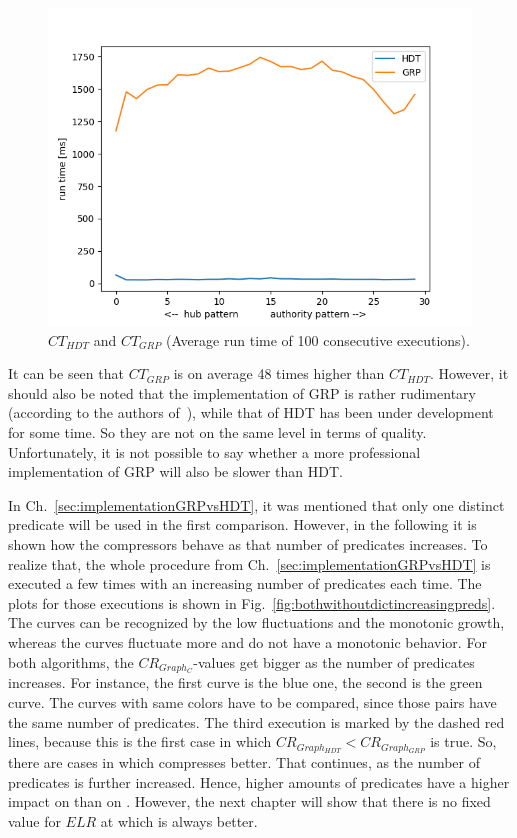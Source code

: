 \begin{figure}
	\centering
	\includegraphics[width=0.7\linewidth]{figures/GRPvsHDT/runtimes}
	\caption{$CT_{HDT}$ and $CT_{GRP}$ (Average run time of 100 consecutive executions).}
	\label{fig:runtimes}
\end{figure}


It can be seen that $CT_{GRP}$ is on average 48 times higher than $CT_{HDT}$. However, it should also be noted that the implementation of GRP is rather rudimentary  (according to the authors of~\cite{maneth}), while that of HDT has been under development for some time. So they are not on the same level in terms of quality. Unfortunately, it is not possible to say whether a more professional implementation of GRP will also be slower than HDT.

In Ch.~\ref{sec:implementationGRPvsHDT}, it was mentioned that only one distinct predicate will be used in the first comparison. However, in the following it is shown how the compressors behave as that number of predicates increases. To realize that, the whole procedure from Ch.~\ref{sec:implementationGRPvsHDT} is executed a few times with an increasing number of predicates each time. The plots for those executions is shown in Fig.~\ref{fig:bothwithoutdictincreasingpreds}. The \GHDT{} curves can be recognized by the low fluctuations and the monotonic growth, whereas the \GGRP{} curves fluctuate more and do not have a monotonic behavior. For both algorithms, the $CR_{Graph_C}$-values get bigger as the number of predicates increases. For  instance, the first \GGRP{} curve is the blue one, the second is the green curve. The curves with same colors have to be compared, since those pairs have the same number of predicates. The third execution is marked by the dashed red lines, because this is the first case in which $CR_{Graph_{HDT}} <CR_{Graph_{GRP}} $ is true. So, there are cases in which \GHDT{} compresses better. That continues, as the number of predicates is further increased. Hence, higher amounts of predicates have a higher impact on \GGRP{} than on \GHDT{}. However, the next chapter will show that there is no fixed value for $ELR$ at which \GHDT{} is always better.


